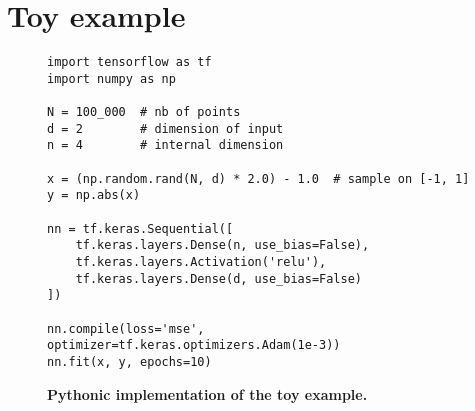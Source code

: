 \section{Toy example}
\label{ap:conclusion:toy_abs}

\begin{figure}
\begin{lstlisting}
import tensorflow as tf
import numpy as np

N = 100_000  # nb of points
d = 2        # dimension of input
n = 4        # internal dimension

x = (np.random.rand(N, d) * 2.0) - 1.0  # sample on [-1, 1]
y = np.abs(x)

nn = tf.keras.Sequential([
    tf.keras.layers.Dense(n, use_bias=False),
    tf.keras.layers.Activation('relu'),
    tf.keras.layers.Dense(d, use_bias=False)
])

nn.compile(loss='mse', optimizer=tf.keras.optimizers.Adam(1e-3))
nn.fit(x, y, epochs=10)
\end{lstlisting}
\caption{\textbf{Pythonic implementation of the toy example.}}
\end{figure}


